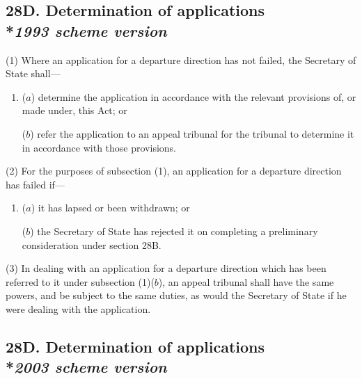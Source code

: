 \documentclass[12pt,a4paper]{article}
\begin{document}
\subsection[28D. Determination of applications --- \emph{1993 scheme version}]{28D. Determination of applications\\*\emph{1993 scheme version}}

(1) Where an application for a departure direction has not failed, the Secretary of State shall—
\begin{enumerate}\item[]
($a$) determine the application in accordance with the relevant provisions of, or made under, this Act; or

($b$) refer the application to 
an appeal tribunal  %
for the tribunal to determine it in accordance with those provisions.
\end{enumerate}

(2) For the purposes of subsection (1), an application for a departure direction has failed if—
\begin{enumerate}\item[]
($a$) it has lapsed or been withdrawn; or

($b$) the Secretary of State has rejected it on completing a preliminary consideration under section 28B.
\end{enumerate}

(3) In dealing with an application for a departure direction which has been referred to it under subsection (1)($b$), 
an appeal tribunal  %
shall have the same powers, and be subject to the same duties, as would the Secretary of State if he were dealing with the application.


\subsection[28D. Determination of applications --- \emph{2003 scheme version}]{28D. Determination of applications\\*\emph{2003 scheme version}}
\end{document}
